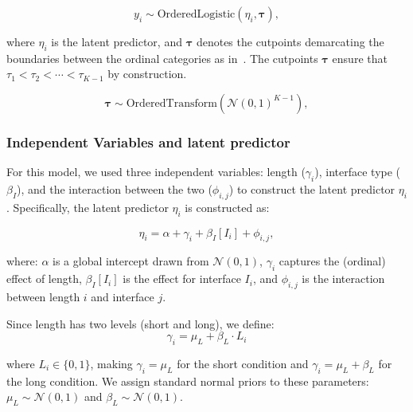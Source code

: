 \begin{equation}
    y_i \sim \text{OrderedLogistic}(\eta_i, \boldsymbol{\tau}),
    \label{eq:cog_main}
\end{equation}

where $\eta_i$ is the latent predictor, and $\boldsymbol{\tau}$ denotes the cutpoints demarcating the boundaries between the ordinal categories as in~. The cutpoints $\boldsymbol{\tau}$ ensure that $\tau_1 < \tau_2 < \cdots < \tau_{K-1}$ by construction.

\begin{equation}
    \boldsymbol{\tau} \sim \text{OrderedTransform}(\mathcal{N}(0, 1)^{K-1}),
    \label{eq:cog_orderedTransfrom}
\end{equation}

\subsubsection{Independent Variables and latent predictor}
For this model, we used three independent variables: length ($\gamma_i$), interface type ($\beta_I$), and the interaction between the two ($\phi_{i,j}$) to construct the latent predictor $\eta_i$. Specifically, the latent predictor $\eta_i$ is constructed as:

\begin{equation}
    \eta_i = \alpha + \gamma_i + \beta_I[I_i] + \phi_{i,j},
    \label{eq:cog_regression}
\end{equation}

where: $\alpha$ is a global intercept drawn from $\mathcal{N}(0,1)$, $\gamma_i$ captures the (ordinal) effect of length, $\beta_I[I_i]$ is the effect for interface $I_i$, and $\phi_{i,j}$ is the interaction between length $i$ and interface $j$. 

Since length has two levels (short and long), we define:
\begin{equation}
    \gamma_i = \mu_L + \beta_L \cdot L_i
    \label{eq:cog_ordinal}
\end{equation}

where $L_i \in \{0,1\}$, making $\gamma_i = \mu_L$ for the short condition and $\gamma_i = \mu_L + \beta_L$ for the long condition. We assign standard normal priors to these parameters: $\mu_L \sim \mathcal{N}(0,1)$ and $\beta_L \sim \mathcal{N}(0,1)$. 

